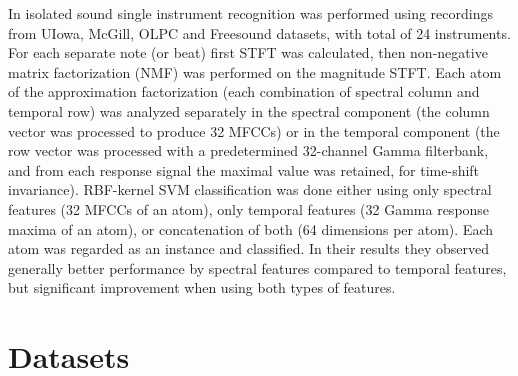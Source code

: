 \documentclass[journal]{IEEEtran}
\begin{document}
In \cite{tjoa2010musical} isolated sound single instrument recognition was performed using recordings from UIowa, McGill, OLPC and Freesound datasets, with total of 24 instruments.
For each separate note (or beat) first STFT was calculated, then non-negative matrix factorization (NMF) was performed on the magnitude STFT. Each atom of the approximation factorization (each combination of spectral column and temporal row) was analyzed separately in the spectral component (the column vector was processed to produce 32 MFCCs) or in the temporal component (the row vector was processed with a predetermined 32-channel Gamma filterbank, and from each response signal the maximal value was retained, for time-shift invariance). RBF-kernel SVM classification was done either using only spectral features (32 MFCCs of an atom), only temporal features (32 Gamma response maxima of an atom), or concatenation of both (64 dimensions per atom). Each atom was regarded as an instance and classified.
In their results they observed generally better performance by spectral features compared to temporal features, but significant improvement when using both types of features.

\section{Datasets}

\ifCLASSOPTIONcaptionsoff
  \newpage
\fi







\end{document}
